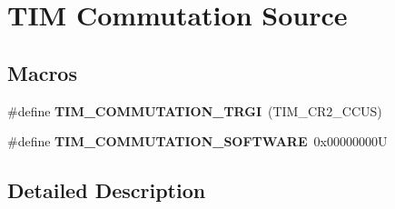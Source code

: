 \hypertarget{group___t_i_m___commutation___source}{}\section{T\+IM Commutation Source}
\label{group___t_i_m___commutation___source}
\subsection*{Macros}
\begin{DoxyCompactItemize}
\item 
\mbox{\label{group___t_i_m___commutation___source_gab2e11763b5e061a5b3056ac970f57ab1}} 
\#define {\bfseries T\+I\+M\+\_\+\+C\+O\+M\+M\+U\+T\+A\+T\+I\+O\+N\+\_\+\+T\+R\+GI}~(T\+I\+M\+\_\+\+C\+R2\+\_\+\+C\+C\+US)
\item 
\mbox{\label{group___t_i_m___commutation___source_ga9cd117a69cbca219c1cf29e74746a496}} 
\#define {\bfseries T\+I\+M\+\_\+\+C\+O\+M\+M\+U\+T\+A\+T\+I\+O\+N\+\_\+\+S\+O\+F\+T\+W\+A\+RE}~0x00000000U
\end{DoxyCompactItemize}


\subsection{Detailed Description}
